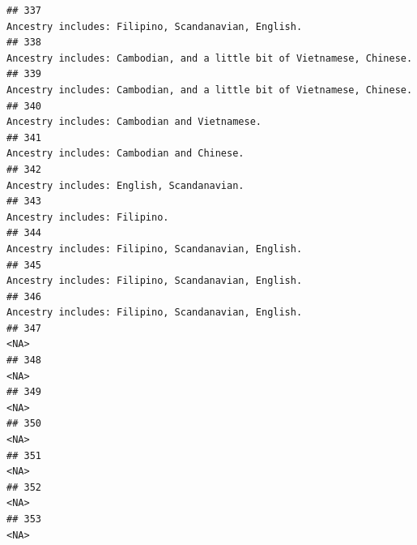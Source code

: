 \documentclass[]{article}
\begin{document}
\begin{verbatim}
## 337                                                                                                 Ancestry includes: Filipino, Scandanavian, English.
## 338                                                                              Ancestry includes: Cambodian, and a little bit of Vietnamese, Chinese.
## 339                                                                              Ancestry includes: Cambodian, and a little bit of Vietnamese, Chinese.
## 340                                                                                                        Ancestry includes: Cambodian and Vietnamese.
## 341                                                                                                           Ancestry includes: Cambodian and Chinese.
## 342                                                                                                           Ancestry includes: English, Scandanavian.
## 343                                                                                                                        Ancestry includes: Filipino.
## 344                                                                                                 Ancestry includes: Filipino, Scandanavian, English.
## 345                                                                                                 Ancestry includes: Filipino, Scandanavian, English.
## 346                                                                                                 Ancestry includes: Filipino, Scandanavian, English.
## 347                                                                                                                                                <NA>
## 348                                                                                                                                                <NA>
## 349                                                                                                                                                <NA>
## 350                                                                                                                                                <NA>
## 351                                                                                                                                                <NA>
## 352                                                                                                                                                <NA>
## 353                                                                                                                                                <NA>

\end{verbatim}
\end{document}
